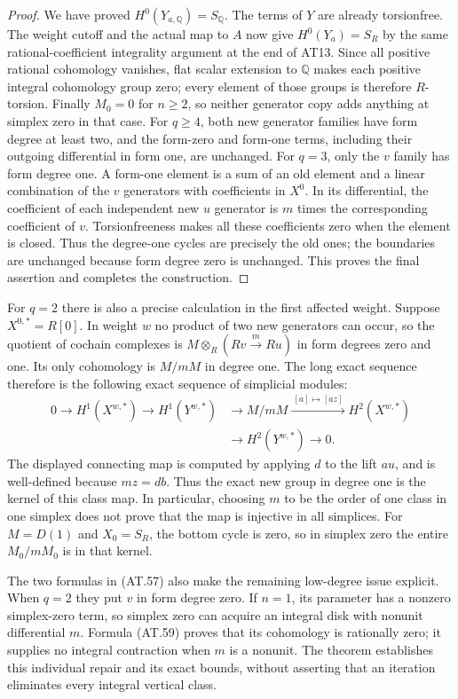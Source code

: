 \begin{proof}
We have proved $H^0(Y_{a,\mathbb Q})=S_{\mathbb Q}$.
The terms of $Y$ are already torsionfree.
The weight cutoff and the actual map to $A$ now
give $H^0(Y_a)=S_R$ by the same rational-coefficient
integrality argument at the end of AT13.
Since all positive rational cohomology vanishes,
flat scalar extension to $\mathbb Q$ makes each
positive integral cohomology group zero; every
element of those groups is therefore $R$-torsion.
Finally $M_0=0$ for $n\geq2$, so neither generator
copy adds anything at simplex zero in that case.
For $q\geq4$, both new generator families have form
degree at least two, and the form-zero and form-one
terms, including their outgoing differential in form
one, are unchanged.  For $q=3$, only the $v$ family
has form degree one.  A form-one element is a sum
of an old element and a linear combination of the
$v$ generators with coefficients in $X^0$.
In its differential, the coefficient of each
independent new $u$ generator is $m$ times the
corresponding coefficient of $v$.
Torsionfreeness makes all these coefficients zero
when the element is closed.  Thus the degree-one
cycles are precisely the old ones; the boundaries
are unchanged because form degree zero is unchanged.
This proves the final assertion and completes the
construction.
\end{proof}

For $q=2$ there is also a precise calculation in the
first affected weight.  Suppose $X^{0,*}=R[0]$.
In weight $w$ no product of two new generators can
occur, so the quotient of cochain complexes is
$M\otimes_R(Rv\xrightarrow{m}Ru)$ in form degrees
zero and one.  Its only cohomology is $M/mM$ in
degree one.  The long exact sequence therefore is
the following exact sequence of simplicial modules:
\[
\begin{split}
0\longrightarrow H^1(X^{w,*})\longrightarrow H^1(Y^{w,*})
 &\longrightarrow M/mM
 \xrightarrow{\ [a]\mapsto[az]\ }H^2(X^{w,*})\\
 &\longrightarrow H^2(Y^{w,*})\longrightarrow0 .
\end{split}
 \tag{AT.60}
\]
The displayed connecting map is computed by applying
$d$ to the lift $a u$, and is well-defined because
$m z=db$.  Thus the exact new group in degree one
is the kernel of this class map.  In particular,
choosing $m$ to be the order of one class in one
simplex does not prove that the map is injective
in all simplices.  For $M=D(1)$ and $X_0=S_R$,
the bottom cycle is zero, so in simplex zero the
entire $M_0/mM_0$ is in that kernel.

The two formulas in \textup{(AT.57)} also make the
remaining low-degree issue explicit.  When $q=2$
they put $v$ in form degree zero.  If $n=1$, its
parameter has a nonzero simplex-zero term, so
simplex zero can acquire an integral disk with
nonunit differential $m$.  Formula \textup{(AT.59)}
proves that its cohomology is rationally zero;
it supplies no integral contraction when $m$ is
a nonunit.  The theorem establishes this individual
repair and its exact bounds, without asserting that
an iteration eliminates every integral vertical class.
